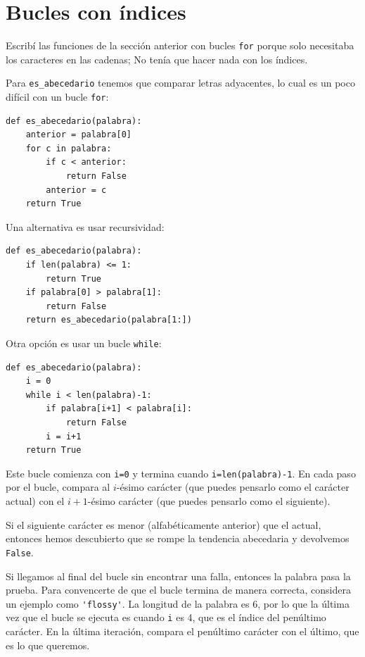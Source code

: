 \documentclass[10pt]{book}
\begin{document}
\section{Bucles con índices}

Escribí las funciones de la sección anterior con bucles {\tt for}
porque solo necesitaba los caracteres en las cadenas; No
tenía que hacer nada con los índices.

Para \verb"es_abecedario" tenemos que comparar letras adyacentes,
lo cual es un poco difícil con un bucle {\tt for}:

\begin{verbatim}
def es_abecedario(palabra):
    anterior = palabra[0]
    for c in palabra:
        if c < anterior:
            return False
        anterior = c
    return True
\end{verbatim}

Una alternativa es usar recursividad:

\begin{verbatim}
def es_abecedario(palabra):
    if len(palabra) <= 1:
        return True
    if palabra[0] > palabra[1]:
        return False
    return es_abecedario(palabra[1:])
\end{verbatim}

Otra opción es usar un bucle {\tt while}:

\begin{verbatim}
def es_abecedario(palabra):
    i = 0
    while i < len(palabra)-1:
        if palabra[i+1] < palabra[i]:
            return False
        i = i+1
    return True
\end{verbatim}
%
Este bucle comienza con {\tt i=0} y termina cuando {\tt i=len(palabra)-1}.  En cada
paso por el bucle, compara al $i$-ésimo carácter (que puedes
pensarlo como el carácter actual) con el $i+1$-ésimo carácter (que puedes
pensarlo como el siguiente).

Si el siguiente carácter es menor (alfabéticamente anterior) que el
actual, entonces hemos descubierto que se rompe la tendencia abecedaria y
devolvemos {\tt False}.

Si llegamos al final del bucle sin encontrar una falla, entonces la
palabra pasa la prueba.  Para convencerte de que el bucle termina
de manera correcta, considera un ejemplo como \verb"'flossy'".  La
longitud de la palabra es 6, por lo que
la última vez que el bucle se ejecuta es cuando {\tt i} es 4, que es el
índice del penúltimo carácter.  En la última iteración,
compara el penúltimo carácter con el último, que es
lo que queremos.
\end{document}

